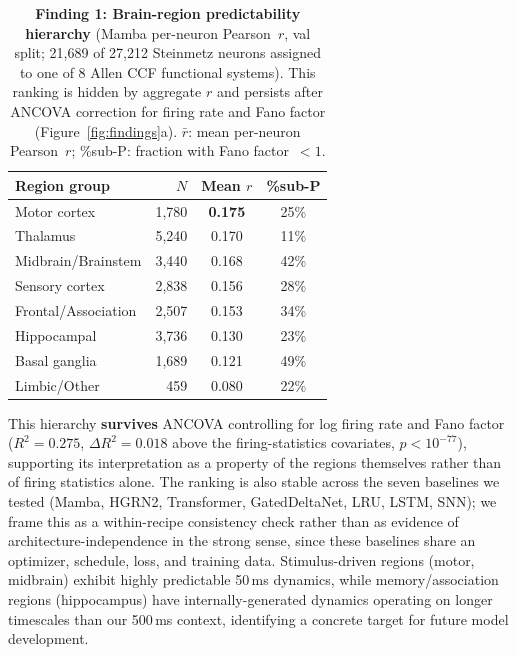 \documentclass{article}
\begin{document}
\begin{table}[!ht]
  \caption{\textbf{Finding 1: Brain-region predictability hierarchy}
    (Mamba per-neuron Pearson~$r$, val split; 21{,}689 of 27{,}212
    Steinmetz neurons assigned to one of 8 Allen CCF functional
    systems).  This ranking is hidden by aggregate $r$ and
    persists after ANCOVA correction for firing rate and Fano factor
    (Figure~\ref{fig:findings}a).
    $\bar{r}$: mean per-neuron Pearson~$r$;
    \%sub-P: fraction with Fano factor~$< 1$.}
  \label{tab:regions}
  \centering
  \small
  \begin{tabular}{@{} l r c c @{}}
    \toprule
    \textbf{Region group} & \textbf{$N$}
      & \textbf{Mean $r$}
      & \textbf{\%sub-P} \\
    \midrule
    Motor cortex          & 1{,}780 & \textbf{0.175} & 25\% \\
    Thalamus              & 5{,}240 & 0.170 & 11\% \\
    Midbrain/Brainstem    & 3{,}440 & 0.168 & 42\% \\
    Sensory cortex        & 2{,}838 & 0.156 & 28\% \\
    Frontal/Association   & 2{,}507 & 0.153 & 34\% \\
    Hippocampal           & 3{,}736 & 0.130 & 23\% \\
    Basal ganglia         & 1{,}689 & 0.121 & 49\% \\
    Limbic/Other          &    459 & 0.080 & 22\% \\
    \bottomrule
  \end{tabular}
\end{table}

This hierarchy \textbf{survives} ANCOVA controlling for log firing rate
and Fano factor ($R^{2}{=}0.275$, $\Delta R^{2}{=}0.018$ above
the firing-statistics covariates, $p < 10^{-77}$), supporting its
interpretation as a property of the regions themselves rather than
of firing statistics alone.  The ranking is also stable across the
seven baselines we tested (Mamba, HGRN2, Transformer, GatedDeltaNet,
LRU, LSTM, SNN); we frame this as a within-recipe consistency
check rather than as evidence of architecture-independence in the
strong sense, since these baselines share an optimizer, schedule,
loss, and training data.  Stimulus-driven regions (motor, midbrain)
exhibit highly predictable 50\,ms dynamics, while memory/association
regions (hippocampus) have internally-generated dynamics operating on
longer timescales than our 500\,ms context, identifying a concrete
target for future model development.
\end{document}
